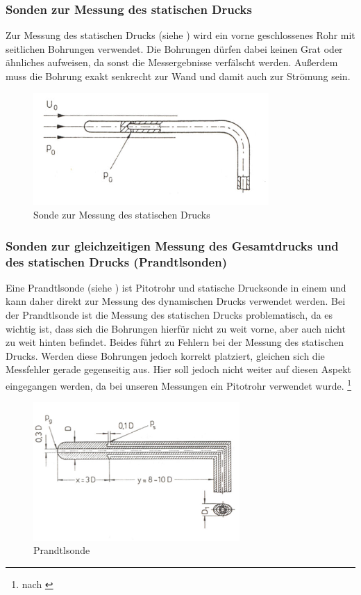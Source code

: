 \subsubsection{Sonden zur Messung des statischen Drucks}
Zur Messung des statischen Drucks (siehe ) wird ein vorne geschlossenes Rohr mit seitlichen Bohrungen verwendet. Die Bohrungen dürfen dabei keinen Grat oder ähnliches aufweisen, da sonst die Messergebnisse verfälscht werden. Außerdem muss die Bohrung exakt senkrecht zur Wand und damit auch zur Strömung sein.
\begin{figure}
	\centering
	\includegraphics[width=0.8\textwidth]{images/statisch}
	\caption{Sonde zur Messung des statischen Drucks}
	\label{statisch}
\end{figure}

\subsubsection{Sonden zur gleichzeitigen Messung des Gesamtdrucks und des statischen Drucks (Prandtlsonden)}
Eine Prandtlsonde (siehe ) ist Pitotrohr und statische Drucksonde in einem und kann daher direkt zur Messung des dynamischen Drucks verwendet werden. Bei der Prandtlsonde ist die Messung des statischen Drucks problematisch, da es wichtig ist, dass sich die Bohrungen hierfür nicht zu weit vorne, aber auch nicht zu weit hinten befindet. Beides führt zu Fehlern bei der Messung des statischen Drucks. Werden diese Bohrungen jedoch korrekt platziert, gleichen sich die Messfehler gerade gegenseitig aus. Hier soll jedoch nicht weiter auf diesen Aspekt eingegangen werden, da bei unseren Messungen ein Pitotrohr verwendet wurde.  \footnote{nach \cite{elmann}}



\begin{figure}
	\centering
	\includegraphics[width=0.7\textwidth]{images/prandtl}
	\caption{Prandtlsonde}
	\label{prandtl}
\end{figure}
